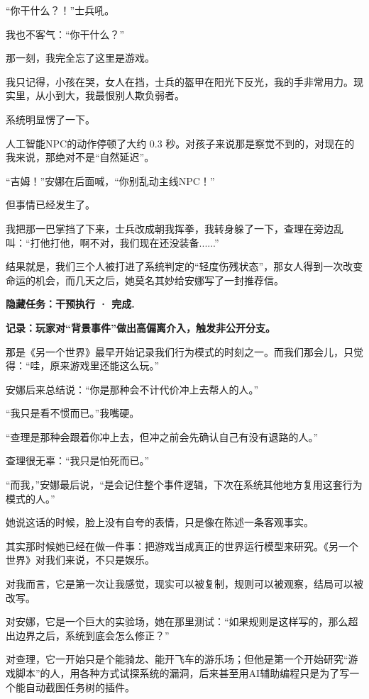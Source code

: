 “你干什么？！”士兵吼。

我也不客气：“你干什么？”

那一刻，我完全忘了这里是游戏。

我只记得，小孩在哭，女人在挡，士兵的盔甲在阳光下反光，我的手非常用力。现实里，从小到大，我最恨别人欺负弱者。

系统明显愣了一下。

人工智能NPC的动作停顿了大约 0.3 秒。对孩子来说那是察觉不到的，对现在的我来说，那绝对不是“自然延迟”。

“吉姆！”安娜在后面喊，“你别乱动主线NPC！”

但事情已经发生了。

我把那一巴掌挡了下来，士兵改成朝我挥拳，我转身躲了一下，查理在旁边乱叫：“打他打他，啊不对，我们现在还没装备......”

结果就是，我们三个人被打进了系统判定的“轻度伤残状态”，那女人得到一次改变命运的机会，而几天之后，她莫名其妙给安娜写了一封推荐信。

\begin{center}
\textbf{隐藏任务：干预执行 · 完成.}
\end{center}

\begin{center}
\textbf{记录：玩家对“背景事件”做出高偏离介入，触发非公开分支。}
\end{center}

那是《另一个世界》最早开始记录我们行为模式的时刻之一。而我们那会儿，只觉得：“哇，原来游戏里还能这么玩。”

安娜后来总结说：“你是那种会不计代价冲上去帮人的人。”

“我只是看不惯而已。”我嘴硬。

“查理是那种会跟着你冲上去，但冲之前会先确认自己有没有退路的人。”

查理很无辜：“我只是怕死而已。”

“而我，”安娜最后说，“是会记住整个事件逻辑，下次在系统其他地方复用这套行为模式的人。”

她说这话的时候，脸上没有自夸的表情，只是像在陈述一条客观事实。

其实那时候她已经在做一件事：把游戏当成真正的世界运行模型来研究。《另一个世界》对我们来说，不只是娱乐。

对我而言，它是第一次让我感觉，现实可以被复制，规则可以被观察，结局可以被改写。

对安娜，它是一个巨大的实验场，她在那里测试：“如果规则是这样写的，那么超出边界之后，系统到底会怎么修正？”

对查理，它一开始只是个能骑龙、能开飞车的游乐场；但他是第一个开始研究“游戏脚本”的人，用各种方式试探系统的漏洞，后来甚至用AI辅助编程只是为了写一个能自动截图任务树的插件。


